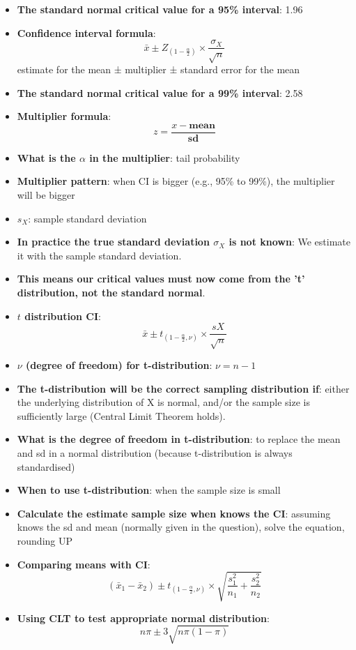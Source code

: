 \documentclass[12pt]{book}
\begin{document}
\begin{itemize}
\item \textbf{The standard normal critical value for a 95\% interval}: 1.96
\item \textbf{Confidence interval formula}: $$\bar{x} \pm Z_{(1-\frac{\alpha}{2})} \times \frac{\sigma_X}{\sqrt{n}}$$
estimate for the mean ± multiplier ± standard error for the mean
\item \textbf{The standard normal critical value for a 99\% interval}: 2.58
\item \textbf{Multiplier formula}: $$z = \frac{x - \textbf{mean}}{\textbf{sd}}$$
\item \textbf{What is the $\alpha$ in the multiplier}: tail probability
\item \textbf{Multiplier pattern}: when CI is bigger (e.g., 95\% to 99\%), the multiplier will be bigger
\item \textbf{$s_X$}: sample standard deviation
\item \textbf{In practice the true standard deviation $\sigma_X$ is not known}: We estimate it with the sample standard deviation.
\item \textbf{This means our critical values must now come from the 't' distribution, not the standard normal}.
\item \textbf{$t$ distribution CI}: $$\bar{x} \pm t_{(1-\frac{\alpha}{2}, \nu)} \times \frac{sX}{\sqrt{n}}$$
\item \textbf{$\nu$ (degree of freedom) for t-distribution}: $\nu = n - 1$
\item \textbf{The t-distribution will be the correct sampling distribution if}: either the underlying distribution of X is normal, and/or the sample size is sufficiently large (Central Limit Theorem holds).
\item \textbf{What is the degree of freedom in t-distribution}: to replace the mean and sd in a normal distribution (because t-distribution is always standardised)
\item \textbf{When to use t-distribution}: when the sample size is small
\item \textbf{Calculate the estimate sample size when knows the CI}: assuming knows the sd and mean (normally given in the question), solve the equation, rounding UP
\item \textbf{Comparing means with CI}: $$(\bar{x}_1 - \bar{x}_2) \pm t_{(1-\frac{\alpha}{2}, \nu)} \times \sqrt{\frac{s_1^2}{n_1} + \frac{s_2^2}{n_2}}$$
\item \textbf{Using CLT to test appropriate normal distribution}: $$n\pi \pm 3 \sqrt{n\pi (1 - \pi)}$$

\end{itemize}
\end{document}
